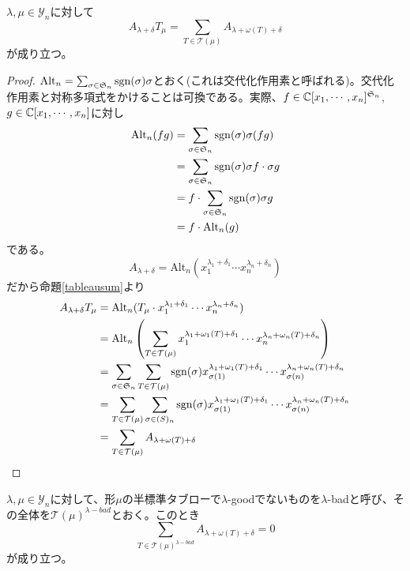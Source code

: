 \documentclass{ltjsarticle}
\begin{document}
\begin{lemm}\label{equality}
    $\lambda,\mu\in\mathcal{Y}_n$に対して
    \[
    A_{\lambda+\delta}T_\mu=\sum_{T\in\mathcal{T}(\mu)}A_{\lambda+\omega(T)+\delta}
    \]
    が成り立つ。
\end{lemm}

\begin{proof}
    $\text{Alt}_n=\sum_{\sigma\in\mathfrak{S}_n}\mathrm{sgn}(\sigma)\sigma$とおく(これは交代化作用素と呼ばれる)。交代化作用素と対称多項式をかけることは可換である。実際、$f\in\mathbb{C}[x_1,\cdots,x_n]^{\mathfrak{S}_n}$, $g\in\mathbb{C}[x_1,\cdots,x_n]$に対し
    \begin{align*}
        \text{Alt}_n(fg)&=\sum_{\sigma\in\mathfrak{S}_n}\mathrm{sgn}(\sigma)\sigma(fg)\\
        &=\sum_{\sigma\in\mathfrak{S}_n}\mathrm{sgn}(\sigma)\sigma f\cdot \sigma g\\
        &=f\cdot\sum_{\sigma\in\mathfrak{S}_n}\mathrm{sgn}(\sigma)\sigma g\\
        &=f\cdot\text{Alt}_n(g)
    \end{align*}
    である。
    \[
    A_{\lambda+\delta}=\text{Alt}_n(x_1^{\lambda_1+\delta_1}\cdots x_n^{\lambda_n+\delta_n})
    \]
    だから命題\ref{tableausum}より
    \begin{align*}
        A_{\lambda+\delta}T_\mu&=\text{Alt}_n(T_\mu\cdot x_1^{\lambda_1+\delta_1}\cdots x_n^{\lambda_n+\delta_n})\\
        &=\text{Alt}_n\left(
            \sum_{T\in\mathcal{T}(\mu)}x_1^{\lambda_1+\omega_1(T)+\delta_1}\cdots x_n^{\lambda_n+\omega_n(T)+\delta_n}
        \right)\\
        &=\sum_{\sigma\in\mathfrak{S}_n}\sum_{T\in\mathcal{T}(\mu)}\mathrm{sgn}(\sigma)x_{\sigma(1)}^{\lambda_1+\omega_1(T)+\delta_1}\cdots x_{\sigma(n)}^{\lambda_n+\omega_n(T)+\delta_n}\\
        &=\sum_{T\in\mathcal{T}(\mu)}\sum_{\sigma\in\mathfrak(S)_n}\mathrm{sgn}(\sigma)x_{\sigma(1)}^{\lambda_1+\omega_1(T)+\delta_1}\cdots x_{\sigma(n)}^{\lambda_n+\omega_n(T)+\delta_n}\\
        &=\sum_{T\in\mathcal{T}(\mu)}A_{\lambda+\omega(T)+\delta}
    \end{align*}
\end{proof}

\begin{lemm}\label{cancellation}
    $\lambda,\mu\in\mathcal{Y}_n$に対して、形$\mu$の半標準タブローで$\lambda$-goodでないものを$\lambda$-badと呼び、その全体を$\mathcal{T}(\mu)^{\lambda-bad}$とおく。このとき
    \[
    \sum_{T\in\mathcal{T}(\mu)^{\lambda-bad}}A_{\lambda+\omega(T)+\delta}=0    
    \]
    が成り立つ。
\end{lemm}
\end{document}
